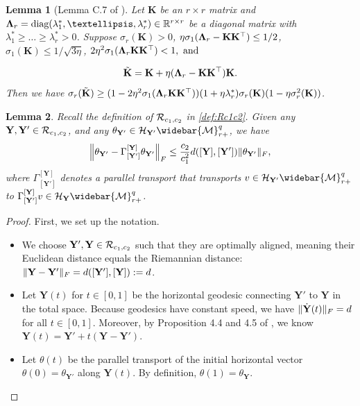 \documentclass[11pt]{article}
\newtheorem{Lemma}{Lemma}
\newcommand{\cH}{\mathcal{H}}
\newcommand{\0}{{\mathbf{0}}}
\newcommand{\1}{{\mathbf{1}}}
\newcommand{\Y}{{\mathbf{Y}}}
\newcommand{\cR}{{\cal R}}
\newcommand{\cM}{{\cal M}}
\newcommand{\F}{{\rm F}}
\begin{document}
{\begin{Lemma}[Lemma C.7 of \cite{jiang2023algorithmic}] \label{lm:K-lower-bound}
	Let $\mathbf{K}$ be an $r \times r$ matrix and ${\bf \Lambda}_r = \text{diag}(\lambda_1^*, \dots, \lambda_r^*) \in \mathbb{R}^{r \times r}$ be a diagonal matrix with $\lambda_1^* \geq \dots \geq \lambda_r^* > 0$. Suppose $\sigma_r(\mathbf{K}) > 0$, $\eta \sigma_1({\bf \Lambda}_r - \mathbf{K} \mathbf{K}^{\top}) \leq 1/2$, $\sigma_1(\mathbf{K}) \leq 1/\sqrt{3\eta}$, $2 \eta^2 \sigma_1({\bf \Lambda}_r \mathbf{K} \mathbf{K}^{\top}) < 1, \text{ and}$

\[
\tilde{\mathbf{K}} = \mathbf{K} + \eta ({\bf \Lambda}_r - \mathbf{K} \mathbf{K}^{\top}) \mathbf{K}.
\]
Then we have $\sigma_r(\tilde{\mathbf{K}}) \geq (1 - 2 \eta^2 \sigma_1({\bf \Lambda}_r \mathbf{K} \mathbf{K}^{\top})) (1 + \eta \lambda_r^*) \sigma_r(\mathbf{K}) (1 - \eta \sigma_r^2(\mathbf{K}))$.
\end{Lemma}


\begin{Lemma}\label{lm:parallel-transport-distance}
	Recall the definition of $\cR_{c_1, c_2}$ in \eqref{def:Rc1c2}. Given any $\Y, \Y' \in \cR_{c_1, c_2}$, and any $\theta_{\Y'} \in  \cH_{\Y'}\widebar{\cM}_{r+}^{q}$, we have 
	\begin{equation*}
		\left\|\theta_{\Y'} - \Gamma_{[\Y']}^{[\Y]} \theta_{\Y'} \right\|_\F \leq \frac{c_2}{c_1^2} d([\Y], [\Y']) \|\theta_{\Y'}\|_{\F},
	\end{equation*} where $\Gamma_{[\Y']}^{[\Y]}$ denotes a parallel transport that transports $v \in  \cH_{\Y'}\widebar{\cM}_{r+}^{q} $ to $ \Gamma_{[\Y']}^{[\Y]} v \in  \cH_\Y\widebar{\cM}_{r+}^{q} $.
\end{Lemma}
\begin{proof} First, we set up the notation.
	\begin{itemize}
    \item We choose $\Y', \Y \in \cR_{c_1, c_2}$ such that they are {optimally aligned}, meaning their Euclidean distance equals the Riemannian distance: $\|\Y - \Y'\|_\F = d([\Y'], [\Y]) := d$.
    \item Let $\Y(t)$ for $t \in [0, 1]$ be the {horizontal geodesic} connecting $\Y'$ to $\Y$ in the total space. Because geodesics have constant speed, we have $\|\dot{\Y}(t)\|_{\F} = d$ for all $t \in [0,1]$. Moreover, by Proposition 4.4 and 4.5 of \cite{massart2020quotient}, we know $\Y(t) = \Y' + t(\Y - \Y')$.
    \item Let $\theta(t)$ be the parallel transport of the initial horizontal vector $\theta(0) = \theta_{\Y'}$ along $\Y(t)$. By definition, $\theta(1) = \theta_{\Y}$.
\end{itemize}


\end{proof}}
\end{document}
